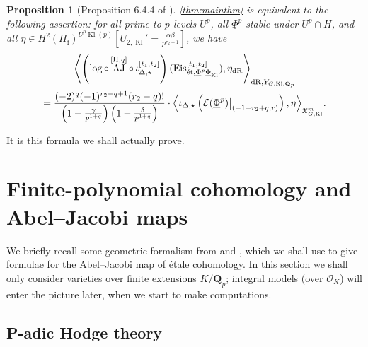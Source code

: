 \documentclass[cjm]{ipart}
\theoremstyle{plain}
\newtheorem{proposition}[theorem]{Proposition}
\theoremstyle{remark}
\DeclareMathOperator{\AJ}{AJ}
\DeclareMathOperator{\Kl}{Kl}
\newcommand{\Eis}{\mathrm{Eis}}
\newcommand{\Pif}{\Pi_{\mathrm{f}}}
\newcommand{\QQ}{\mathbf{Q}}
\newcommand{\Qp}{\QQ_p}
\newcommand{\cE}{\mathcal{E}}
\newcommand{\cO}{\mathcal{O}}
\newcommand{\dR}{\mathrm{dR}}
\newcommand{\et}{\text{\textup{\'et}}}
\newcommand{\uPhi}{\underline{\Phi}}
\numberwithin{equation}{subsection}
\begin{document}
  \begin{proposition}[{Proposition 6.4.4 of \cite{LZ-equivar}}]
   \label{prop:weprove}
   \cref{thm:mainthm} is equivalent to the following assertion: for all prime-to-$p$ levels $U^p$, all $\uPhi^p$ stable under $U^p \cap H$, and all $\eta \in H^2(\Pif)^{U^p \Kl(p)}[U_{2, \Kl}' = \frac{\alpha\beta}{p^{r_2 + 1}}]$, we have
   \begin{multline}
    \label{eq:goal2}
    \left\langle \left(\log \circ \AJ^{[\Pi, q]} \mathop{\circ} \iota^{[t_1,t_2]}_{\Delta, \star}\right)(\Eis^{[t_1, t_2]}_{\et, \uPhi^p \uPhi_{\Kl}}),\eta_{\dR}\right\rangle_{\dR, Y_{G, \Kl, \Qp}}
    \\ = \frac{(-2)^q (-1)^{r_2 - q+1}(r_2 - q)!}
    {\left(1 - \frac{\gamma}{p^{1+q}}\right)\left(1 - \frac{\delta}{p^{1+q}}\right)}
    \cdot \Big\langle \iota_{\Delta, \star}\left(\cE(\uPhi^p)\big|_{(-1-r_2 + q, r)}\right), \eta \Big\rangle_{\mathfrak{X}_{G, \Kl}^{m}}.
   \end{multline}
  \end{proposition}

  It is this formula we shall actually prove.



\section{Finite-polynomial cohomology and Abel--Jacobi maps}
 \label{sect:abeljacobi}

 We briefly recall some geometric formalism from \cite{nekovarniziol16} and \cite{besserloefflerzerbes16}, which we shall use to give formulae for the Abel--Jacobi map of \'etale cohomology. In this section we shall only consider varieties over finite extensions $K/\Qp$; integral models (over $\cO_K$) will enter the picture later, when we start to make computations.

 \subsection{P-adic Hodge theory}
\end{document}
